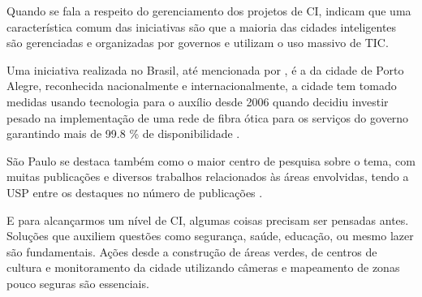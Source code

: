 Quando se fala a respeito do gerenciamento dos projetos de CI,  indicam que uma característica comum das iniciativas são que a maioria das cidades inteligentes são gerenciadas e organizadas por governos e utilizam o uso massivo de TIC. 

Uma iniciativa realizada no Brasil, até mencionada por , é a da cidade de Porto Alegre, reconhecida nacionalmente e internacionalmente, a cidade tem tomado medidas usando tecnologia para o auxílio desde 2006 quando decidiu investir pesado na implementação de uma rede de fibra ótica para os serviços do governo garantindo mais de 99.8 \% de disponibilidade \cite{weiss}.

 São Paulo se destaca também como o maior centro de pesquisa sobre o tema, com muitas publicações e diversos trabalhos relacionados às áreas envolvidas, tendo a USP entre os destaques no número de publicações \cite{lazzaretti}. 


E para alcançarmos um nível de CI, algumas coisas precisam ser pensadas antes. Soluções que auxiliem questões como segurança, saúde, educação, ou mesmo lazer são fundamentais. Ações desde a construção de áreas verdes, de centros de cultura e monitoramento da cidade utilizando câmeras e mapeamento de zonas pouco seguras são essenciais. 

